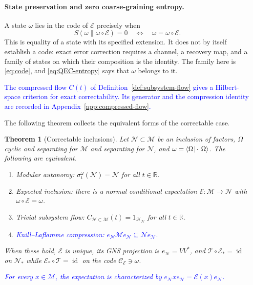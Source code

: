 \documentclass[a4paper,11pt]{article}
\newtheorem{theorem}{Theorem}
\theoremstyle{definition}
\newcommand{\mN}{\mathcal{N}}
\newcommand{\mH}{\mathcal{H}}
\newcommand{\mM}{\mathcal{M}}
\newcommand{\NL}[1]{\textcolor{blue}{#1}}
\newcommand{\mE}{\mathcal{E}}
\begin{document}
\paragraph{State preservation and zero coarse-graining entropy.}
A state $\omega$ lies in the code of $\mE$ precisely when
\begin{equation}
 S(\omega\|\omega\circ\mE)=0\quad\Longleftrightarrow\quad\omega=\omega\circ\mE .
 \label{eq:QEC-entropy}
\end{equation}
This is equality of a state with its specified extension. It does not by itself establish a code: exact error correction requires a channel, a recovery map, and a family of states on which their composition is the identity. The family here is \eqref{eq:code}, and \eqref{eq:QEC-entropy} says that $\omega$ belongs to it.

\NL{The compressed flow $C(t)$ of Definition~\ref{def:subsystem-flow} gives a Hilbert-space criterion for exact correctability. Its generator and the compression identity are recorded in Appendix~\ref{app:compressed-flow}.}

The following theorem collects the equivalent forms of the correctable case.
\begin{theorem}[Correctable inclusions]\label{thm:correctable}\label{prop:KL}
Let $\mN\subset\mM$ be an inclusion of factors, $\Omega$ cyclic and separating for $\mM$ and separating for $\mN$, and $\omega=\braket{\Omega|\cdot\,\Omega}$. The following are equivalent.
\begin{enumerate}
 \item[\rm(i)] \emph{Modular autonomy:} $\sigma^{\omega}_t(\mN)=\mN$ for all $t\in\mathbb R$.
 \item[\rm(ii)] \emph{Expected inclusion:} there is a normal conditional expectation $\mE:\mM\to\mN$ with $\omega\circ\mE=\omega$.
 \item[\rm(iii)] \emph{Trivial subsystem flow:} $C_{\mN\subset\mM}(t)=1_{\mH_{\mN}}$ for all $t\in\mathbb R$.
\item[\rm(iv)] \NL{\emph{Knill--Laflamme compression:} $e_{\mN}\mM e_{\mN}\subseteq\mN e_{\mN}$.}
\end{enumerate}
When these hold, $\mE$ is unique, its GNS projection is $e_{\mN}=VV^*$, and $\mathcal T\circ\mE_*=\operatorname{id}$ on $\mN_*$ while $\mE_*\circ\mathcal T=\operatorname{id}$ on the code $\mathcal C_{\mE}\ni\omega$.

\NL{For every $x\in\mM$, the expectation is characterized by $e_{\mN}xe_{\mN}=\mE(x)e_{\mN}$.}
\end{theorem}
\end{document}
